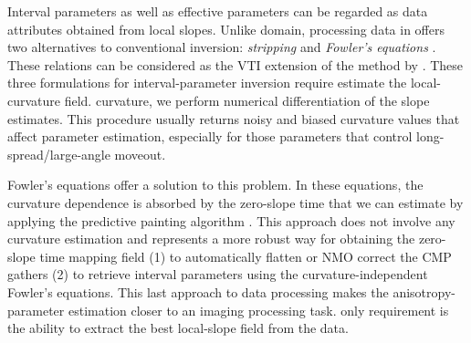 Interval parameters as well as effective parameters can be regarded as
data attributes obtained from local slopes. Unlike \tx domain,
processing data in \taup offers two alternatives to conventional
\citet{dix:68} inversion: \textit{stripping} and \textit{Fowler's
  equations} \citep{fowler:3028}. These relations can be considered as
the VTI extension of the  method  by
\cite{Claerbout.sep.14.13}. These three formulations for
interval-parameter inversion require   estimate
 the  local-curvature field.   curvature,  we  perform 
 numerical differentiation of the slope estimates. This
procedure usually returns noisy and biased curvature values that
affect parameter estimation, especially for those parameters that
control long-spread/large-angle moveout.

Fowler's equations offer a solution to this problem. In these
equations, the curvature dependence is absorbed by the zero-slope time
that we can estimate by applying the predictive painting algorithm
\citep{fomel:A25}. This approach does not involve any curvature
estimation and  represents a more robust way for obtaining the
zero-slope time mapping field   (1) to
automatically flatten or NMO correct the \taup CMP gathers (2) to
retrieve interval parameters using the curvature-independent Fowler's
equations.  This last approach to data processing makes the
anisotropy-parameter estimation closer to an imaging processing task.
  only requirement is the ability to extract the
best local-slope field from the data.


